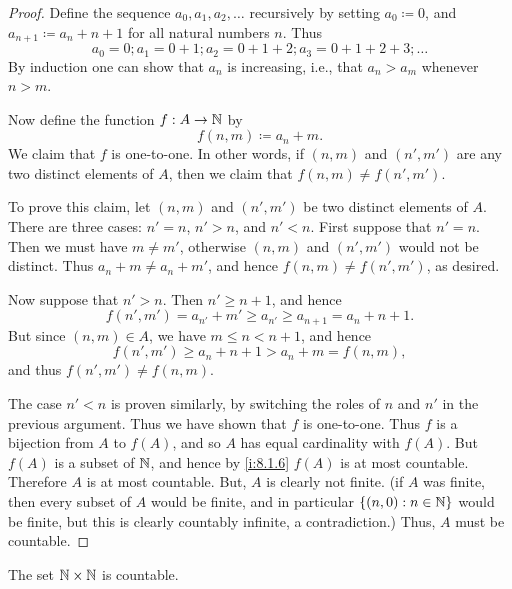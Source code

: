 \begin{proof}
  Define the sequence \(a_0, a_1, a_2, \dots\) recursively by setting \(a_0 \coloneqq 0\), and \(a_{n + 1} \coloneqq a_n + n + 1\) for all natural numbers \(n\).
  Thus
  \[
    a_0 = 0; a_1 = 0 + 1; a_2 = 0 + 1 + 2; a_3 = 0 + 1 + 2 + 3; \dots
  \]
  By induction one can show that \(a_n\) is increasing, i.e., that \(a_n > a_m\) whenever \(n > m\).

  Now define the function \(f : A \to \mathbb{N}\) by
  \[
    f(n, m) \coloneqq a_n + m.
  \]
  We claim that \(f\) is one-to-one.
  In other words, if \((n, m)\) and \((n', m')\) are any two distinct elements of \(A\), then we claim that \(f(n, m) \neq f(n', m')\).

  To prove this claim, let \((n, m)\) and \((n', m')\) be two distinct elements of \(A\).
  There are three cases: \(n' = n\), \(n' > n\), and \(n' < n\).
  First suppose that \(n' = n\).
  Then we must have \(m \neq m'\), otherwise \((n, m)\) and \((n', m')\) would not be distinct.
  Thus \(a_n + m \neq a_n + m'\), and hence \(f(n, m) \neq f(n', m')\), as desired.

  Now suppose that \(n' > n\).
  Then \(n' \geq n + 1\), and hence
  \[
    f(n', m') = a_{n'} + m' \geq a_{n'} \geq a_{n + 1} = a_n + n + 1.
  \]
  But since \((n, m) \in A\), we have \(m \leq n < n + 1\), and hence
  \[
    f(n', m') \geq a_n + n + 1 > a_n + m = f(n, m),
  \]
  and thus \(f(n', m') \neq f(n, m)\).

  The case \(n' < n\) is proven similarly, by switching the roles of \(n\) and \(n'\) in the previous argument.
  Thus we have shown that \(f\) is one-to-one.
  Thus \(f\) is a bijection from \(A\) to \(f(A)\), and so \(A\) has equal cardinality with \(f(A)\).
  But \(f(A)\) is a subset of \(\mathbb{N}\), and hence by \cref{i:8.1.6} \(f(A)\) is at most countable.
  Therefore \(A\) is at most countable.
  But, \(A\) is clearly not finite.
  (if \(A\) was finite, then every subset of \(A\) would be finite, and in particular \(\left\lbrace(n, 0) : n \in \mathbb{N}\right\rbrace\) would be finite, but this is clearly countably infinite, a contradiction.)
  Thus, \(A\) must be countable.
\end{proof}

\begin{cor}\label{i:8.1.13}
  The set \(\mathbb{N} \times \mathbb{N}\) is countable.
\end{cor}

